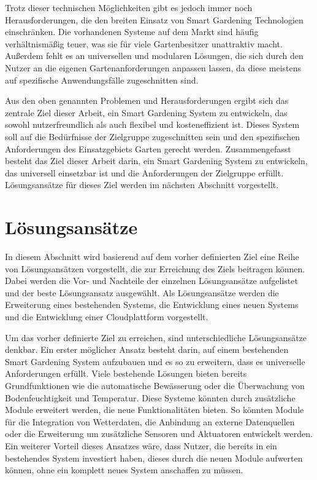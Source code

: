 Trotz dieser technischen Möglichkeiten gibt es jedoch immer noch Herausforderungen, die den breiten Einsatz von Smart Gardening Technologien einschränken.
Die vorhandenen Systeme auf dem Markt sind häufig verhältnismäßig teuer, was sie für viele Gartenbesitzer unattraktiv macht.
Außerdem fehlt es an universellen und modularen Lösungen, die sich durch den Nutzer an die eigenen Gartenanforderungen anpassen lassen, da diese meistens auf spezifische Anwendungsfälle zugeschnitten sind.

\pagebreak

Aus den oben genannten Problemen und Herausforderungen ergibt sich das zentrale Ziel dieser Arbeit, ein Smart Gardening System zu entwickeln, das sowohl nutzerfreundlich als auch flexibel und kosteneffizient ist.
Dieses System soll auf die Bedürfnisse der Zielgruppe zugeschnitten sein und den spezifischen Anforderungen des Einsatzgebiets Garten gerecht werden.
Zusammengefasst besteht das Ziel dieser Arbeit darin, ein Smart Gardening System zu entwickeln, das universell einsetzbar ist und die Anforderungen der Zielgruppe erfüllt.
Lösungsansätze für dieses Ziel werden im nächsten Abschnitt vorgestellt.



\section{Lösungsansätze}
In diesem Abschnitt wird basierend auf dem vorher definierten Ziel eine Reihe von Lösungsansätzen vorgestellt, die zur Erreichung des Ziels beitragen können.
Dabei werden die Vor- und Nachteile der einzelnen Lösungsansätze aufgelistet und der beste Lösungsansatz ausgewählt.
Als Lösungsansätze werden die Erweiterung eines bestehenden Systems, die Entwicklung eines neuen Systems und die Entwicklung einer Cloudplattform vorgestellt.

Um das vorher definierte Ziel zu erreichen, sind unterschiedliche Lösungsansätze denkbar.
Ein erster möglicher Ansatz besteht darin, auf einem bestehenden Smart Gardening System aufzubauen und es so zu erweitern, dass es universelle Anforderungen erfüllt.
Viele bestehende Lösungen bieten bereits Grundfunktionen wie die automatische Bewässerung oder die Überwachung von Bodenfeuchtigkeit und Temperatur.
Diese Systeme könnten durch zusätzliche Module erweitert werden, die neue Funktionalitäten bieten.
So könnten Module für die Integration von Wetterdaten, die Anbindung an externe Datenquellen oder die Erweiterung um zusätzliche Sensoren und Aktuatoren entwickelt werden.
Ein weiterer Vorteil dieses Ansatzes wäre, dass Nutzer, die bereits in ein bestehendes System investiert haben, dieses durch die neuen Module aufwerten können, ohne ein komplett neues System anschaffen zu müssen.

